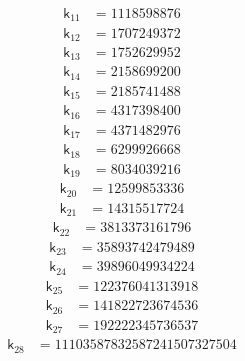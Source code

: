 \[
\begin{aligned}
\mathsf{k}_{11} &={} 1118598876
\end{aligned}
\]
\[
\begin{aligned}
\mathsf{k}_{12} &={} 1707249372
\end{aligned}
\]
\[
\begin{aligned}
\mathsf{k}_{13} &={} 1752629952
\end{aligned}
\]
\[
\begin{aligned}
\mathsf{k}_{14} &={} 2158699200
\end{aligned}
\]
\[
\begin{aligned}
\mathsf{k}_{15} &={} 2185741488
\end{aligned}
\]
\[
\begin{aligned}
\mathsf{k}_{16} &={} 4317398400
\end{aligned}
\]
\[
\begin{aligned}
\mathsf{k}_{17} &={} 4371482976
\end{aligned}
\]
\[
\begin{aligned}
\mathsf{k}_{18} &={} 6299926668
\end{aligned}
\]
\[
\begin{aligned}
\mathsf{k}_{19} &={} 8034039216
\end{aligned}
\]
\[
\begin{aligned}
\mathsf{k}_{20} &={} 12599853336
\end{aligned}
\]
\[
\begin{aligned}
\mathsf{k}_{21} &={} 14315517724
\end{aligned}
\]
\[
\begin{aligned}
\mathsf{k}_{22} &={} 3813373161796
\end{aligned}
\]
\[
\begin{aligned}
\mathsf{k}_{23} &={} 35893742479489
\end{aligned}
\]
\[
\begin{aligned}
\mathsf{k}_{24} &={} 39896049934224
\end{aligned}
\]
\[
\begin{aligned}
\mathsf{k}_{25} &={} 122376041313918
\end{aligned}
\]
\[
\begin{aligned}
\mathsf{k}_{26} &={} 141822723674536
\end{aligned}
\]
\[
\begin{aligned}
\mathsf{k}_{27} &={} 192222345736537
\end{aligned}
\]
\[
\begin{aligned}
\mathsf{k}_{28} &={} 11103587832587241507327504
\end{aligned}
\]
